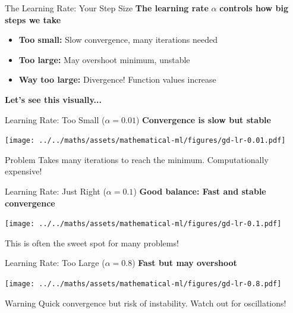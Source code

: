 \documentclass[usenames,dvipsnames]{beamer}
\begin{document}
  \begin{frame}{The Learning Rate: Your Step Size}
    \textbf{The learning rate} $\alpha$ \textbf{controls how big steps we take}
    
    \begin{itemize}[<+->]
        \item \textbf{Too small:} Slow convergence, many iterations needed
        \item \textbf{Too large:} May overshoot minimum, unstable
        \item \textbf{Way too large:} Divergence! Function values increase
    \end{itemize}
    
    \pause
    \textbf{Let's see this visually...}
  \end{frame}

  \begin{frame}{Learning Rate: Too Small ($\alpha = 0.01$)}
    \textbf{Convergence is slow but stable}
    \begin{center}
    \texttt{[image: ../../maths/assets/mathematical-ml/figures/gd-lr-0.01.pdf]}
    \end{center}
    
    \begin{alertbox}{Problem}
    Takes many iterations to reach the minimum. Computationally expensive!
    \end{alertbox}
  \end{frame}

  \begin{frame}{Learning Rate: Just Right ($\alpha = 0.1$)}
    \textbf{Good balance: Fast and stable convergence}
    \begin{center}
    \texttt{[image: ../../maths/assets/mathematical-ml/figures/gd-lr-0.1.pdf]}
    \end{center}
    
    \begin{keypointsbox}
    This is often the sweet spot for many problems!
    \end{keypointsbox}
  \end{frame}

  \begin{frame}{Learning Rate: Too Large ($\alpha = 0.8$)}
    \textbf{Fast but may overshoot}
    \begin{center}
    \texttt{[image: ../../maths/assets/mathematical-ml/figures/gd-lr-0.8.pdf]}
    \end{center}
    
    \begin{alertbox}{Warning}
    Quick convergence but risk of instability. Watch out for oscillations!
    \end{alertbox}
  \end{frame}
\end{document}
